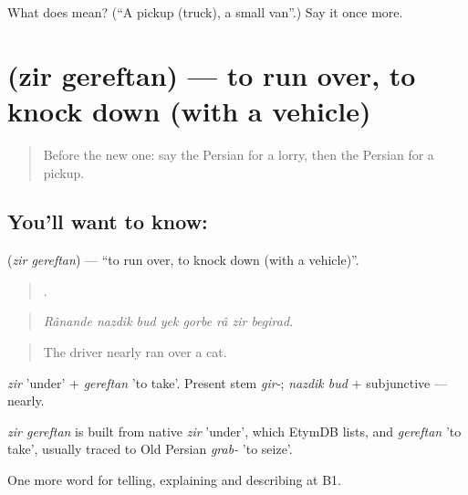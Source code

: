 \begin{tcolorbox}[breakable,colback=teal!4,colframe=teal!35!black,title={Before you move on}]
What does  mean? (\textquotedblleft{}A pickup (truck), a small van\textquotedblright{}.) Say it once more.
\end{tcolorbox}
\section[\texorpdfstring{\fa{زیر} \fa{گرفتن} (zir gereftan)}{زیر گرفتن (zir gereftan)}]{  (zir gereftan) — to run over, to knock down (with a vehicle)}

\label{lesson:FA-C428-zir-gereftan}



\begin{quote}
Before the new one: say the Persian for a lorry, then the Persian for a pickup.
\end{quote}

\subsection*{You'll want to know:  }
\textbf{ } (\emph{zir gereftan}) — \textquotedblleft{}to run over, to knock down (with a vehicle)\textquotedblright{}.

\begin{quote}
       .
\end{quote}

\begin{quote}
\emph{Rânande nazdik bud yek gorbe râ zir begirad.}
\end{quote}

\begin{quote}
The driver nearly ran over a cat.
\end{quote}

\emph{zir} 'under' + \emph{gereftan} 'to take'. Present stem \emph{gir-}; \emph{nazdik bud} + subjunctive — nearly.

\begin{cousinweb}
\emph{zir gereftan} is built from native \emph{zir} 'under', which EtymDB lists, and \emph{gereftan} 'to take', usually traced to Old Persian \emph{grab-} 'to seize'.
\end{cousinweb}

\begin{grammarlens}[title={What you've built}]
One more word for telling, explaining and describing at B1.
\end{grammarlens}

